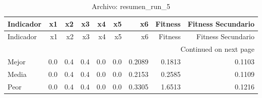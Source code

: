 \begin{longtable}{lrrrrrrrr}
\caption{Archivo: resumen\_run\_5}\label{tab:resumen_run_5} \\
\toprule
Indicador & x1 & x2 & x3 & x4 & x5 & x6 & Fitness & Fitness Secundario \\
\midrule
\endfirsthead
\toprule
Indicador & x1 & x2 & x3 & x4 & x5 & x6 & Fitness & Fitness Secundario \\
\midrule
\endhead
\midrule
\multicolumn{9}{r}{Continued on next page} \\
\midrule
\endfoot
\bottomrule
\endlastfoot
Mejor & 0.0 & 0.4 & 0.4 & 0.0 & 0.0 & 0.2089 & 0.1813 & 0.1103 \\
Media & 0.0 & 0.4 & 0.4 & 0.0 & 0.0 & 0.2153 & 0.2585 & 0.1109 \\
Peor & 0.0 & 0.4 & 0.4 & 0.0 & 0.0 & 0.3305 & 1.6513 & 0.1216 \\
\end{longtable}